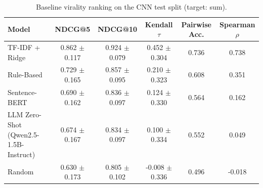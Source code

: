 \begin{table}[t]
\centering
\small
\begin{tabular}{lccccc}
\toprule
\textbf{Model} & \textbf{NDCG@5} & \textbf{NDCG@10} & \textbf{Kendall $\tau$} & \textbf{Pairwise Acc.} & \textbf{Spearman $\rho$} \\
\midrule
TF-IDF + Ridge & 0.862 $\pm$ 0.117 & 0.924 $\pm$ 0.079 & 0.452 $\pm$ 0.304 & 0.736 & 0.738 \\
Rule-Based & 0.729 $\pm$ 0.165 & 0.857 $\pm$ 0.095 & 0.210 $\pm$ 0.323 & 0.608 & 0.351 \\
Sentence-BERT & 0.690 $\pm$ 0.162 & 0.836 $\pm$ 0.097 & 0.124 $\pm$ 0.330 & 0.564 & 0.162 \\
LLM Zero-Shot (Qwen2.5-1.5B-Instruct) & 0.674 $\pm$ 0.167 & 0.834 $\pm$ 0.097 & 0.100 $\pm$ 0.334 & 0.552 & 0.049 \\
Random & 0.630 $\pm$ 0.173 & 0.805 $\pm$ 0.102 & -0.008 $\pm$ 0.336 & 0.496 & -0.018 \\
\bottomrule
\end{tabular}
\caption{Baseline virality ranking on the CNN test split (target: sum).}
\label{tab:cnn_baselines}
\end{table}